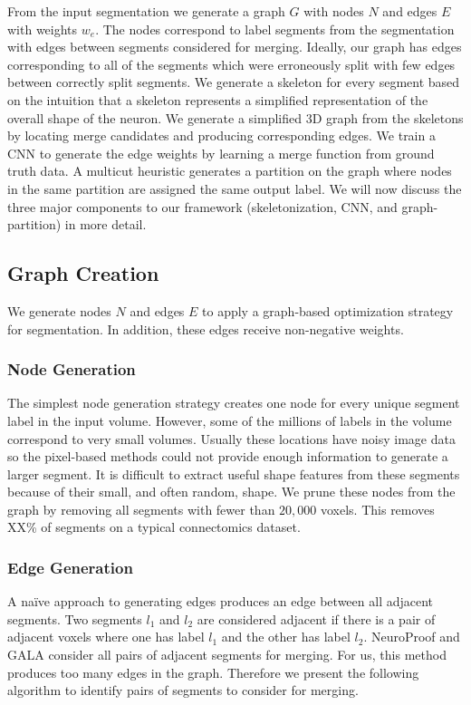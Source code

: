From the input segmentation we generate a graph $G$ with nodes $N$ and edges $E$ with weights $w_e$. The nodes correspond to label segments from the segmentation with edges between segments considered for merging. Ideally, our graph has edges corresponding to all of the segments which were erroneously split with few edges between correctly split segments. We generate a skeleton for every segment based on the intuition that a skeleton represents a simplified representation of the overall shape of the neuron. We generate a simplified 3D graph from the skeletons by locating merge candidates and producing corresponding edges. We train a CNN to  generate the edge weights by learning a merge function from ground truth data. A multicut heuristic generates a partition on the graph where nodes in the same partition are assigned the same output label. We will now discuss the three major components to our framework (skeletonization, CNN, and graph-partition) in more detail. 

\subsection{Graph Creation}
\label{sec:skeletonization}
We generate nodes $N$ and edges $E$ to apply a graph-based optimization strategy for segmentation.
In addition, these edges receive non-negative weights.

\subsubsection{Node Generation}

The simplest node generation strategy creates one node for every unique segment label in the input volume.
However, some of the millions of labels in the volume correspond to very small volumes.
Usually these locations have noisy image data so the pixel-based methods could not provide enough information to generate a larger segment.
It is difficult to extract useful shape features from these segments because of their small, and often random, shape.
We prune these nodes from the graph by removing all segments with fewer than $20,000$ voxels.
This removes XX\% of segments on a typical connectomics dataset.

\subsubsection{Edge Generation}

A na\"ive approach to generating edges produces an edge between all adjacent segments.
Two segments $l_1$ and $l_2$ are considered adjacent if there is a pair of adjacent voxels where one has label $l_1$ and the other has label $l_2$.
NeuroProof and GALA consider all pairs of adjacent segments for merging.
For us, this method produces too many edges in the graph.
Therefore we present the following algorithm to identify pairs of segments to consider for merging.

